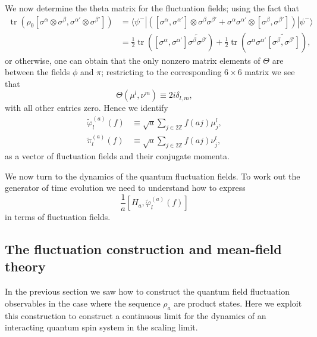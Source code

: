 \documentclass[prl,twocolumn,lengthcheck,superscriptaddress]{revtex4-1}
\newcommand{\tr}{\operatorname{tr}}
\theoremstyle{definition}
\theoremstyle{remark}
\begin{document}
We now determine the theta matrix for the fluctuation fields; using the fact that
\begin{equation}
	\begin{split}
	\tr(\rho_{0} [\sigma^\alpha \otimes \sigma^\beta,\sigma^{\alpha'} \otimes \sigma^{\beta'}]) &= \langle \psi^{-}|([\sigma^\alpha, \sigma^{\alpha'}]\otimes \sigma^\beta\sigma^{\beta'} +\sigma^\alpha\sigma^{\alpha'} \otimes [\sigma^\beta, \sigma^{\beta'}])|\psi^{-}\rangle \\
	&= \frac12\tr([\sigma^\alpha, \sigma^{\alpha'}]\widetilde{\sigma^\beta\sigma^{\beta'}}) + \frac12\tr(\sigma^\alpha\sigma^{\alpha'}\widetilde{[\sigma^\beta, \sigma^{\beta'}]}),
	\end{split}
\end{equation}
or otherwise, one can obtain that the only nonzero matrix elements of $\Theta$ are between the fields $\phi$ and $\pi$; restricting to the corresponding  $6\times 6$ matrix we see that
\begin{equation}
	\Theta(\mu^l, \nu^m) \equiv 2i\delta_{l,m},
\end{equation}
with all other entries zero. Hence we identify 
\begin{equation}
	\begin{split}
		\widetilde{\varphi}_l^{(a)}(f) &\equiv \sqrt{a} \sum_{j\in2\mathbb{Z}} f(aj) \mu_j^l, \\
		\widetilde{\pi}_l^{(a)}(f) &\equiv \sqrt{a} \sum_{j\in2\mathbb{Z}} f(aj) \nu_j^l,
	\end{split}
\end{equation}
as a vector of fluctuation fields and their conjugate momenta.

We now turn to the dynamics of the quantum fluctuation fields. To work out the generator of time evolution we need to understand how to express 
\begin{equation}
	\frac{1}{a}[H_a, \widetilde{\varphi}_l^{(a)}(f)] 
\end{equation}
in terms of fluctuation fields. 

\subsection{The fluctuation construction and mean-field theory}
In the previous section we saw how to construct the quantum field fluctuation observables in the case where the sequence $\rho_a$ are product states. Here we exploit this construction to construct a continuous limit for the dynamics of an interacting quantum spin system in the scaling limit. 
\end{document}
